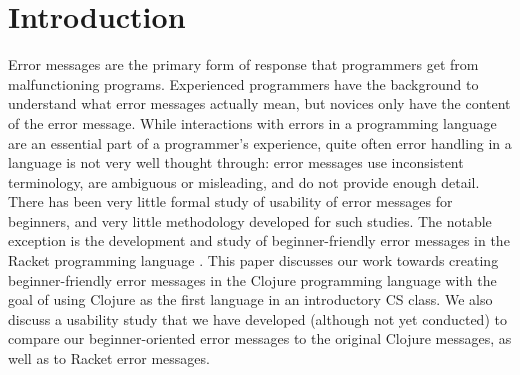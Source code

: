 \documentclass[submission,copyright,creativecommons]{eptcs}
\begin{document}
\section{Introduction}\label{sec:intro}
Error messages are the primary form of response that programmers get from malfunctioning programs. 
Experienced programmers have the background to understand what error messages actually mean, but novices only have the content of the error message. 
While interactions with errors in a programming language are an essential part of a programmer's experience, quite often error handling in a language is not very well thought through: 
error messages use inconsistent terminology, are ambiguous or misleading, and do not provide enough detail. 
There has been very little formal study of usability of error messages for beginners, and very little methodology developed for such studies. The notable exception is the development and study of beginner-friendly error messages in the Racket programming language \cite{Marceau:2011,Marceau:2011-2}.
This paper discusses our work towards creating beginner-friendly error messages in the Clojure programming language with the goal of using Clojure as the first language in an introductory CS class.  
We also discuss a usability study that we have developed (although not yet conducted) to compare our beginner-oriented error messages to the original Clojure messages, as well as to Racket error messages.
\end{document}
